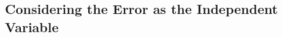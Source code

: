 %
%
%
%
%
%
%
%



\subsection{Considering the Error as the Independent Variable}\label{sec:sos_1storder_error}

